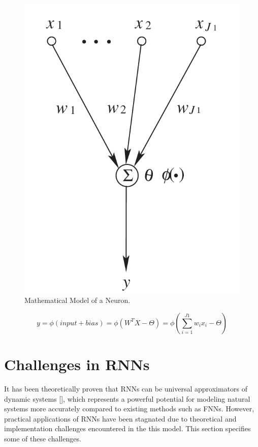 \begin{figure}[h]
	\centering
	\includegraphics{Figures/neuron_mathematical_model.PNG}
	\decoRule
	\caption[Mathematical Model of a Neuron]{Mathematical Model of a Neuron.}
	\label{fig:Neuron}
\end{figure}

\begin{equation}\label{eq:3}
	y=\phi(input + bias)=\phi(W^{T}X-\Theta)=\phi(\sum_{i=1}^{J1} w_i x_i - \Theta)
\end{equation}

\section{Challenges in RNNs}
It has been theoretically proven that RNNs can be universal approximators of dynamic systems [\cite{Reference1}], which represents a powerful potential for modeling natural systems more accurately compared to existing methods such as FNNs. However, practical applications of RNNs have been stagnated due to theoretical and implementation challenges encountered in the this model. This section specifies some of these challenges. 

